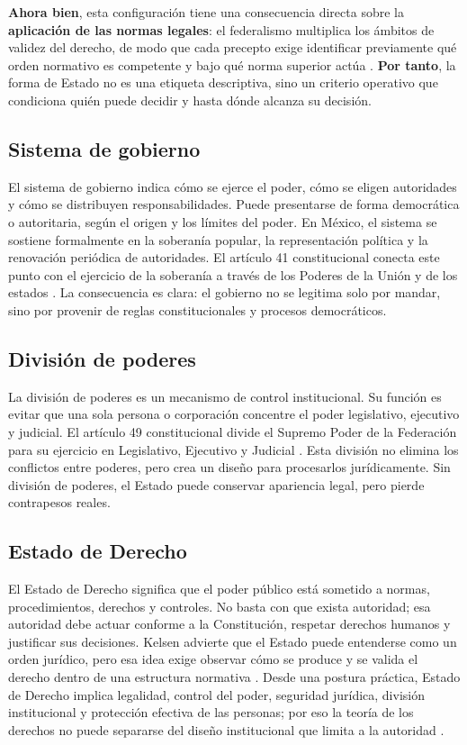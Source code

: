 \documentclass[
spanish,
letterpaper, oneside
]{article}
\begin{document}
	\textbf{Ahora bien}, esta configuración tiene una consecuencia directa sobre la \textbf{aplicación de las normas legales}: el federalismo multiplica los ámbitos de validez del derecho, de modo que cada precepto exige identificar previamente qué orden normativo es competente y bajo qué norma superior actúa \citep{kelsen1982,garcia2002}. \textbf{Por tanto}, la forma de Estado no es una etiqueta descriptiva, sino un criterio operativo que condiciona quién puede decidir y hasta dónde alcanza su decisión.
	
	\subsection{Sistema de gobierno}
	
	El sistema de gobierno indica cómo se ejerce el poder, cómo se eligen autoridades y cómo se distribuyen responsabilidades. Puede presentarse de forma democrática o autoritaria, según el origen y los límites del poder. En México, el sistema se sostiene formalmente en la soberanía popular, la representación política y la renovación periódica de autoridades. El artículo 41 constitucional conecta este punto con el ejercicio de la soberanía a través de los Poderes de la Unión y de los estados \citep{cpeum2026}. La consecuencia es clara: el gobierno no se legitima solo por mandar, sino por provenir de reglas constitucionales y procesos democráticos.
	
	\subsection{División de poderes}
	
	La división de poderes es un mecanismo de control institucional. Su función es evitar que una sola persona o corporación concentre el poder legislativo, ejecutivo y judicial. El artículo 49 constitucional divide el Supremo Poder de la Federación para su ejercicio en Legislativo, Ejecutivo y Judicial \citep{cpeum2026}. Esta división no elimina los conflictos entre poderes, pero crea un diseño para procesarlos jurídicamente. Sin división de poderes, el Estado puede conservar apariencia legal, pero pierde contrapesos reales.
	
	\subsection{Estado de Derecho}
	
	El Estado de Derecho significa que el poder público está sometido a normas, procedimientos, derechos y controles. No basta con que exista autoridad; esa autoridad debe actuar conforme a la Constitución, respetar derechos humanos y justificar sus decisiones. Kelsen advierte que el Estado puede entenderse como un orden jurídico, pero esa idea exige observar cómo se produce y se valida el derecho dentro de una estructura normativa \citep{kelsen1982}. Desde una postura práctica, Estado de Derecho implica legalidad, control del poder, seguridad jurídica, división institucional y protección efectiva de las personas; por eso la teoría de los derechos no puede separarse del diseño institucional que limita a la autoridad \citep{ansutegui2007}.
	
\end{document}
